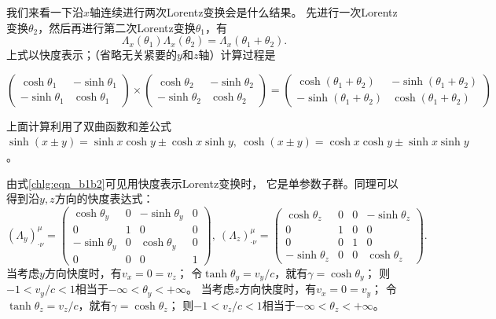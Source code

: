 我们来看一下沿$x$轴连续进行两次Lorentz变换会是什么结果。
先进行一次Lorentz变换$\theta_2$，然后再进行第二次Lorentz变换$\theta_1$，有
\begin{equation}\label{chlg:eqn_b1b2}
    \Lambda_x(\theta_1) \Lambda_x(\theta_2) = \Lambda_x(\theta_1+\theta_2).
\end{equation}
上式以快度表示；（省略无关紧要的$y$和$z$轴）计算过程是
\begin{small}
\[\begin{pmatrix}
    \cosh\theta_1  & -\sinh\theta_1 \\
    -\sinh\theta_1 & \cosh\theta_1  
\end{pmatrix} \times
\begin{pmatrix}
    \cosh\theta_2  & -\sinh\theta_2  \\
    -\sinh\theta_2 & \cosh\theta_2   
\end{pmatrix} = 
\begin{pmatrix}
    \cosh(\theta_1+\theta_2)  & -\sinh(\theta_1+\theta_2)  \\
    -\sinh(\theta_1+\theta_2) & \cosh(\theta_1+\theta_2) 
\end{pmatrix} \]
\end{small}
上面计算利用了双曲函数和差公式
$\sinh(x \pm y) = \sinh x \cosh y \pm  \cosh x \sinh y, \ 
\cosh(x \pm y) = \cosh x \cosh y \pm  \sinh x \sinh y$。

由式\eqref{chlg:eqn_b1b2}可见用快度表示Lorentz变换时，
它是单参数子群。同理可以得到沿$y,z$方向的快度表达式：
\begin{equation*}  %
    (\Lambda_y)^{\mu}_{\cdot \nu} = 
    \begin{pmatrix}
        \cosh\theta_y  & 0 & -\sinh\theta_y & 0 \\
        0 & 1  & 0 & 0 \\
        -\sinh\theta_y & 0 & \cosh\theta_y & 0 \\
        0 & 0 & 0 & 1 
    \end{pmatrix},\
    (\Lambda_z)^{\mu}_{\cdot \nu} = 
    \begin{pmatrix}
        \cosh\theta_z  & 0 & 0 & -\sinh\theta_z \\
        0 & 1  & 0 & 0 \\
        0 & 0 & 1 & 0 \\
        -\sinh\theta_z & 0 & 0 & \cosh\theta_z
    \end{pmatrix} .
\end{equation*}
当考虑$y$方向快度时，有$v_x=0=v_z$；
令$\tanh \theta_y=v_y/c$，就有$\gamma = \cosh \theta_y$；
则$-1<v_y/c<1$相当于$-\infty < \theta_y <+\infty$。
当考虑$z$方向快度时，有$v_x=0=v_y$；
令$\tanh \theta_z=v_z/c$，就有$\gamma = \cosh \theta_z$；
则$-1<v_z/c<1$相当于$-\infty < \theta_z <+\infty$。





